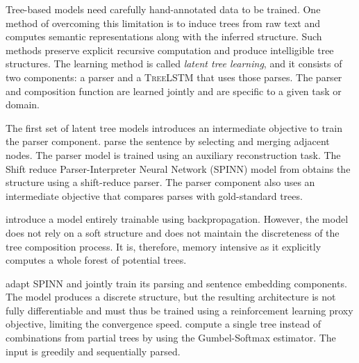  Tree-based models need carefully hand-annotated data to be trained. One method of overcoming this limitation is to induce trees from raw text and computes semantic representations along with the inferred structure. Such methods preserve explicit recursive computation and produce intelligible tree structures. The learning method is called \textit{latent tree learning}, and it  consists of two components: a parser and a \textsc{TreeLSTM} that uses those parses. The parser and composition function are learned jointly and are specific to a given task or domain. 


The first set of latent tree models introduces an intermediate objective to train the parser component. \textcite{socher_11c} parse the sentence by selecting and merging adjacent nodes. The parser model is trained using an auxiliary reconstruction task. The Shift reduce Parser-Interpreter Neural Network (SPINN) model from \textcite{bowman_16} obtains the structure using a shift-reduce parser. The parser component also uses an intermediate objective that compares parses with gold-standard trees.

\textcite{maillard_19} introduce a model entirely trainable using backpropagation. However, the model does not rely on a soft structure and does not maintain the discreteness of the tree composition process. It is, therefore, memory intensive as it explicitly computes a whole forest of 
potential trees. 

\textcite{yogatama_17} adapt \textsc{SPINN} and jointly train its parsing and sentence embedding components. The model produces a discrete structure, but the resulting architecture is not fully differentiable and must thus be trained using a reinforcement learning proxy objective, limiting the convergence speed. \textcite{choi_18} compute a single tree instead of combinations from partial trees by using the Gumbel-Softmax estimator. The input is greedily and sequentially parsed.




